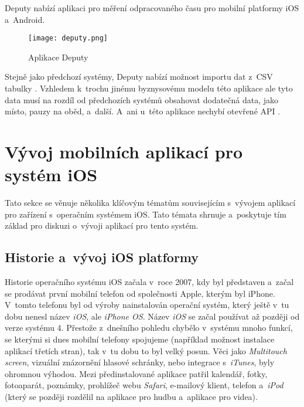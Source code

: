 Deputy nabízí aplikaci pro měření odpracovaného času pro mobilní platformy iOS a~Android. 

\begin{figure}[h]
	\centering
	\texttt{[image: deputy.png]}
	\caption{Aplikace Deputy \cite{deputy-time-tracking-app}}
\end{figure}

Stejně jako předchozí systémy, Deputy nabízí možnost importu dat z~CSV tabulky \cite{deputy-import-csv}. Vzhledem k~trochu jinému byznysovému modelu této aplikace ale tyto data musí na rozdíl od předchozích systémů obsahovat dodatečná data, jako místo, pauzy na oběd, a~další. A~ani u~této aplikace nechybí otevřené API \cite{deputy-api}.

\section{Vývoj mobilních aplikací pro systém iOS}

Tato sekce se věnuje několika klíčovým tématům souvisejícím s~vývojem aplikací pro zařízení s~operačním systémem iOS. Tato témata shrnuje a~poskytuje tím základ pro diskuzi o~vývoji aplikací pro tento systém.

\subsection{Historie a~vývoj iOS platformy}

Historie operačního systému iOS začala v~roce 2007, kdy byl představen a~začal se prodávat první mobilní telefon od společnosti Apple, kterým byl iPhone. V~tomto telefonu byl od výroby nainstalován operační systém, který ještě v~tu dobu nenesl název \emph{iOS}, ale \emph{iPhone OS}. Název \emph{iOS} se začal používat až později od verze systému 4. Přestože z~dnešního pohledu chybělo v~systému mnoho funkcí, se kterými si dnes mobilní telefony spojujeme (například možnost instalace aplikací třetích stran), tak v~tu dobu to byl velký posun. Věci jako \emph{Multitouch screen}, vizuální znázornění hlasové schránky, nebo integrace s~\emph{iTunes}, byly ohromnou výhodou. Mezi předinstalované aplikace patřil kalendář, fotky, fotoaparát, poznámky, prohlížeč webu \emph{Safari}, e-mailový klient, telefon a~\emph{iPod} (který se později rozdělil na aplikace pro hudbu a~aplikace pro videa).

